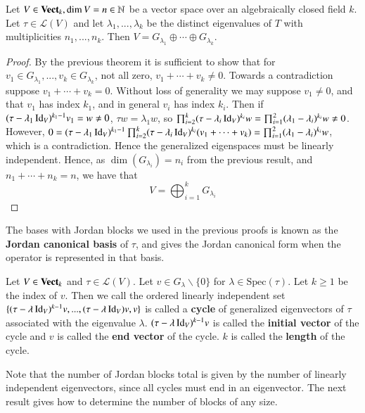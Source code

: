\begin{theorem}
    Let $V\in\normalfont\textbf{Vect}_{k}, \dim V = n\in \mathbb N$ be a vector space over an algebraically closed field $k$. Let $\tau \in \mathcal{L}(V)$ and let $\lambda_1,...,\lambda_k$ be the distinct eigenvalues of $T$ with multiplicities $n_1,...,n_k$. Then $V = G_{\lambda_1}\oplus\cdots\oplus G_{\lambda_k}$.
\end{theorem}
\begin{proof}
    By the previous theorem it is sufficient to show that for $v_1 \in G_{\lambda_1},...,v_k \in G_{\lambda_k}$, not all zero, $v_1+\cdots + v_k \neq 0$. Towards a contradiction suppose $v_1+\cdots+v_k = 0$. Without loss of generality we may suppose $v_1 \neq 0$, and that $v_1$ has index $k_1$, and in general $v_i$ has index $k_i$. Then if $(\tau-\lambda_1\operatorname{Id}_V)^{k_1-1}v_1 = w \neq 0$, $\tau w = \lambda_1 w$, so $\prod_{i=2}^{k}(\tau-\lambda_i\operatorname{Id}_V)^{k_i}w = \prod_{i=1}^2(\lambda_1-\lambda_i)^{k_i}w \neq 0$. However, $0 = (\tau-\lambda_1\operatorname{Id}_V)^{k_1-1}\prod_{i=2}^{k}(\tau-\lambda_i\operatorname{Id}_V)^{k_i}(v_1+\cdots+v_k) = \prod_{i=1}^2(\lambda_1-\lambda_i)^{k_i}w$, which is a contradiction. Hence the generalized eigenspaces must be linearly independent. Hence, as $\dim(G_{\lambda_i}) = n_i$ from the previous result, and $n_1+\cdots+n_k = n$, we have that $$V=\bigoplus_{i=1}^kG_{\lambda_i}$$
\end{proof}

The bases with Jordan blocks we used in the previous proofs is known as the \textbf{Jordan canonical basis} of $\tau$, and gives the Jordan canonical form when the operator is represented in that basis.

\begin{definition}
    Let $V \in \normalfont\textbf{Vect}_{k}$ and $\tau \in \mathcal{L}(V)$. Let $v \in G_{\lambda}\backslash\{0\}$ for $\lambda \in \text{Spec}(\tau)$. Let $k \geq 1$ be the index of $v$. Then we call the ordered linearly independent set $\{(\tau-\lambda \operatorname{Id}_V)^{k-1}v,...,(\tau-\lambda\operatorname{Id}_V)v,v\}$ is called a \textbf{cycle} of generalized eigenvectors of $\tau$ associated with the eigenvalue $\lambda$. $(\tau-\lambda\operatorname{Id}_V)^{k-1}v$ is called the \textbf{initial vector} of the cycle and $v$ is called the \textbf{end vector} of the cycle. $k$ is called the \textbf{length} of the cycle.
\end{definition}

Note that the number of Jordan blocks total is given by the number of linearly independent eigenvectors, since all cycles must end in an eigenvector. The next result gives how to determine the number of blocks of any size.


